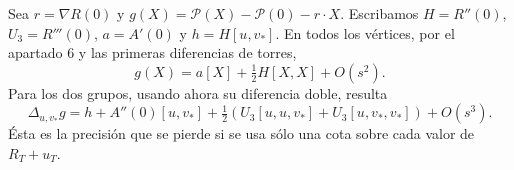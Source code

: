 Sea $r=\nabla R(0)$ y $g(X)=\mathcal P(X)-\mathcal P(0)-r\cdot X$.
Escribamos $H=R''(0)$, $U_3=R'''(0)$, $a=A'(0)$ y $h=H[u,v_*]$.
En todos los vértices, por el apartado 6 y las primeras diferencias de torres,
\[
 g(X)=a[X]+\tfrac12 H[X,X]+O(s^2).
\]
Para los dos grupos, usando ahora su diferencia doble, resulta
\[
 \Delta_{u,v_*}g=h+A''(0)[u,v_*]
       +\tfrac12(U_3[u,u,v_*]+U_3[u,v_*,v_*])+O(s^3).
\]
Ésta es la precisión que se pierde si se usa sólo una cota sobre cada valor de $R_T+u_T$.
